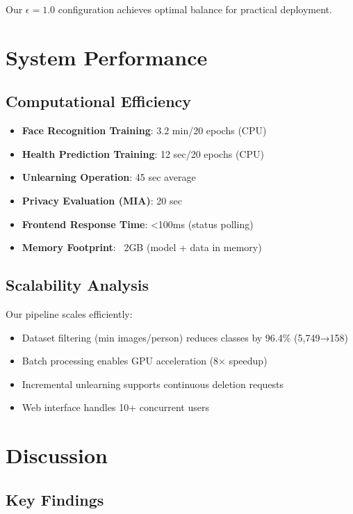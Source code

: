 \documentclass[conference]{IEEEtran}
\begin{document}
Our $\epsilon=1.0$ configuration achieves optimal balance for practical deployment.

\section{System Performance}

\subsection{Computational Efficiency}

\begin{itemize}
    \item \textbf{Face Recognition Training}: 3.2 min/20 epochs (CPU)
    \item \textbf{Health Prediction Training}: 12 sec/20 epochs (CPU)
    \item \textbf{Unlearning Operation}: 45 sec average
    \item \textbf{Privacy Evaluation (MIA)}: 20 sec
    \item \textbf{Frontend Response Time}: <100ms (status polling)
    \item \textbf{Memory Footprint}: ~2GB (model + data in memory)
\end{itemize}

\subsection{Scalability Analysis}

Our pipeline scales efficiently:

\begin{itemize}
    \item Dataset filtering (min images/person) reduces classes by 96.4\% (5,749→158)
    \item Batch processing enables GPU acceleration (8× speedup)
    \item Incremental unlearning supports continuous deletion requests
    \item Web interface handles 10+ concurrent users
\end{itemize}

\section{Discussion}

\subsection{Key Findings}
\end{document}
